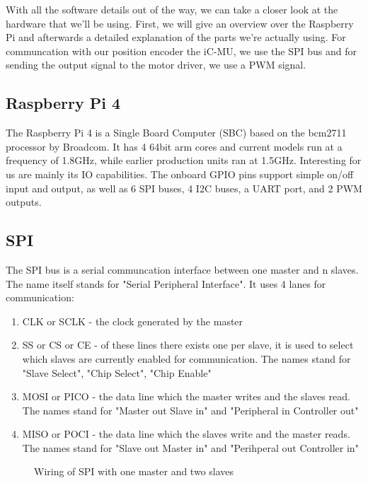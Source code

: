 With all the software details out of the way, we can take a closer look at the hardware that we'll be using.
First, we will give an overview over the Raspberry Pi and afterwards a detailed explanation of the parts we're actually using.
For communcation with our position encoder the iC-MU, we use the SPI bus and for sending the output signal to the motor driver, we use a PWM signal.

\subsection{Raspberry Pi 4}
\label{sec:background:hardware:pi}

The Raspberry Pi 4 is a Single Board Computer (SBC) based on the bcm2711 processor by Broadcom.
It has 4 64bit arm cores and current models run at a frequency of 1.8GHz, while earlier production units ran at 1.5GHz.
Interesting for us are mainly its IO capabilities.
The onboard GPIO pins support simple on/off input and output, as well as 6 SPI buses, 4 I2C buses, a UART port, and 2 PWM outputs.

\subsection{SPI}
\label{sec:background:hardware:spi}

The SPI bus is a serial communcation interface between one master and n slaves.
The name itself stands for "Serial Peripheral Interface".
It uses 4 lanes for communication\cite[p. 220]{SensornetzwerkeInTheorieUndPraxis}:

\begin{enumerate}
    \item CLK or SCLK - the clock generated by the master
    \item SS or CS or CE - of these lines there exists one per slave, it is used to select which slaves are currently enabled for communication. The names stand for "Slave Select", "Chip Select", "Chip Enable"
    \item MOSI or PICO - the data line which the master writes and the slaves read. The names stand for "Master out Slave in" and "Peripheral in Controller out"
    \item MISO or POCI - the data line which the slaves write and the master reads. The names stand for "Slave out Master in" and "Perihperal out Controller in"
\end{enumerate}

\begin{figure}[hp]
    \begin{center}
        
        \caption{Wiring of SPI with one master and two slaves}
        \label{fig:spi}
    \end{center}
\end{figure}

